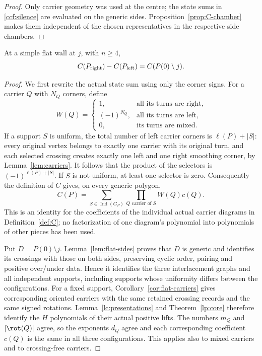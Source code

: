 \begin{proof}
Only carrier geometry was used at the centre; the state sums in
\eqref{ccf:silence} are evaluated on the generic sides.
Proposition~\ref{prop:C-chamber} makes them independent of the chosen
representatives in the respective side chambers.
\end{proof}

\begin{theorem}\label{thm:C-S3}\leanok
At a simple flat wall at $j$, with $n\geq4$,
\begin{equation}\label{ccf:flat-law}
C(P_{\rm right})-C(P_{\rm left})=C(P(0)\setminus j).
\end{equation}

\end{theorem}
\begin{proof}\leanok{}
We first rewrite the actual state sum using only the corner signs.
For a carrier $Q$ with $N_Q$ corners, define
\begin{equation}\label{ccf:selector}
W(Q)=
\begin{cases}
1,&\text{all its turns are right},\\
(-1)^{N_Q},&\text{all its turns are left},\\
0,&\text{its turns are mixed}.
\end{cases}
\end{equation}
If a support $S$ is uniform, the total number of left carrier corners is
$\ell(P)+|S|$: every original vertex belongs to exactly one carrier with
its original turn, and each selected crossing creates exactly one left
and one right smoothing corner, by Lemma~\ref{lem:carriers}. It follows
that the product of the selectors is $(-1)^{\ell(P)+|S|}$. If $S$ is
not uniform, at least one selector is zero. Consequently the definition
of $C$ gives, on every generic polygon,
\begin{equation}\label{ccf:selector-sum}
C(P)=\sum_{S\in\operatorname{Ind}(G_P)}
       \prod_{Q\text{ carrier of }S}W(Q)c(Q).
\end{equation}
This is an identity for the coefficients of the individual actual carrier
diagrams in Definition~\ref{def:C}; no factorization of one diagram's
polynomial into polynomials of other pieces has been used.

Put $D=P(0)\setminus j$. Lemma~\ref{lem:flat-sides} proves that $D$
is generic and identifies its crossings with those on both sides,
preserving cyclic order, pairing and positive over/under data. Hence it
identifies the three interlacement graphs and all independent supports,
including supports whose uniformity differs between the configurations.
For a fixed support, Corollary~\ref{cor:flat-carriers} gives corresponding
oriented carriers with the same retained crossing records and the same
signed rotations. Lemma~\ref{lc:presentations} and
Theorem~\ref{lp:core} therefore identify the $H$ polynomials of their
actual positive lifts. The numbers $m_Q$ and
$|\rot(Q)|$ agree, so the exponents $d_Q$ agree and each corresponding
coefficient $c(Q)$ is the same in all three configurations. This applies
also to mixed carriers and to crossing-free carriers.


\end{proof}
